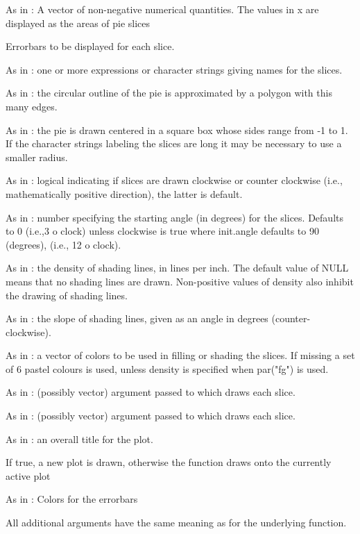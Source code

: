 \documentclass[a4paper]{book}
\begin{document}
\begin{Arguments}
\begin{ldescription}
\item[\code{x}] As in : A vector of non-negative numerical quantities. The values in x are displayed as the areas of pie slices

\item[\code{sd\_x}] Errorbars to be displayed for each slice.

\item[\code{labels}] As in : one or more expressions or character strings giving names for the slices.
\item[\code{edges}] As in : the circular outline of the pie is approximated by a polygon with this many edges.
\item[\code{radius}] As in : the pie is drawn centered in a square box whose sides range from -1 to 1. If the character strings labeling the slices are long it may be necessary to use a smaller radius.
\item[\code{clockwise}] As in : logical indicating if slices are drawn clockwise or counter clockwise (i.e., mathematically positive direction), the latter is default.
\item[\code{init.angle}] As in : number specifying the starting angle (in degrees) for the slices. Defaults to 0 (i.e.,3 o clock) unless clockwise is true where init.angle defaults to 90 (degrees), (i.e., 12 o clock).
\item[\code{density}] As in : the density of shading lines, in lines per inch. The default value of NULL means that no shading lines are drawn. Non-positive values of density also inhibit the drawing of shading lines.
\item[\code{angle}] As in : the slope of shading lines, given as an angle in degrees (counter-clockwise).
\item[\code{col}] As in : a vector of colors to be used in filling or shading the slices. If missing a set of 6 pastel colours is used, unless density is specified when par("fg") is used.
\item[\code{border}] As in : (possibly vector) argument passed to  which draws each slice.
\item[\code{lty}] As in : (possibly vector) argument passed to  which draws each slice.
\item[\code{main}] As in : an overall title for the plot.
\item[\code{initiate\_plot}] If true, a new plot is drawn, otherwise the function draws onto the currently active plot
\item[\code{col\_errorbar}] As in : Colors for the errorbars

\item[\code{...}] 
All additional arguments have the same meaning as for the underlying  function.


\end{ldescription}
\end{Arguments}
\end{document}
